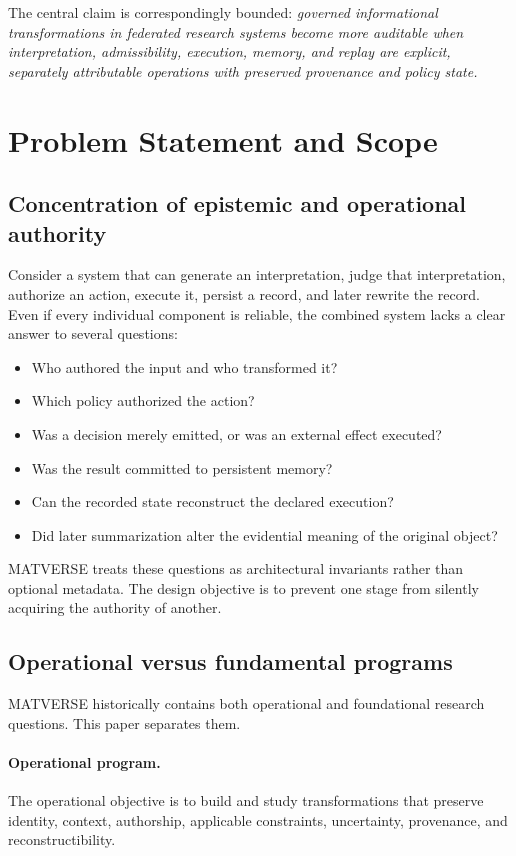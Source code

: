 \documentclass[11pt]{article}
\begin{document}
The central claim is correspondingly bounded: \emph{governed informational transformations in federated research systems become more auditable when interpretation, admissibility, execution, memory, and replay are explicit, separately attributable operations with preserved provenance and policy state.}

\section{Problem Statement and Scope}

\subsection{Concentration of epistemic and operational authority}

Consider a system that can generate an interpretation, judge that interpretation, authorize an action, execute it, persist a record, and later rewrite the record. Even if every individual component is reliable, the combined system lacks a clear answer to several questions:

\begin{itemize}
  \item Who authored the input and who transformed it?
  \item Which policy authorized the action?
  \item Was a decision merely emitted, or was an external effect executed?
  \item Was the result committed to persistent memory?
  \item Can the recorded state reconstruct the declared execution?
  \item Did later summarization alter the evidential meaning of the original object?
\end{itemize}

MATVERSE treats these questions as architectural invariants rather than optional metadata. The design objective is to prevent one stage from silently acquiring the authority of another.

\subsection{Operational versus fundamental programs}

MATVERSE historically contains both operational and foundational research questions. This paper separates them.

\paragraph{Operational program.} The operational objective is to build and study transformations that preserve identity, context, authorship, applicable constraints, uncertainty, provenance, and reconstructibility.
\end{document}
